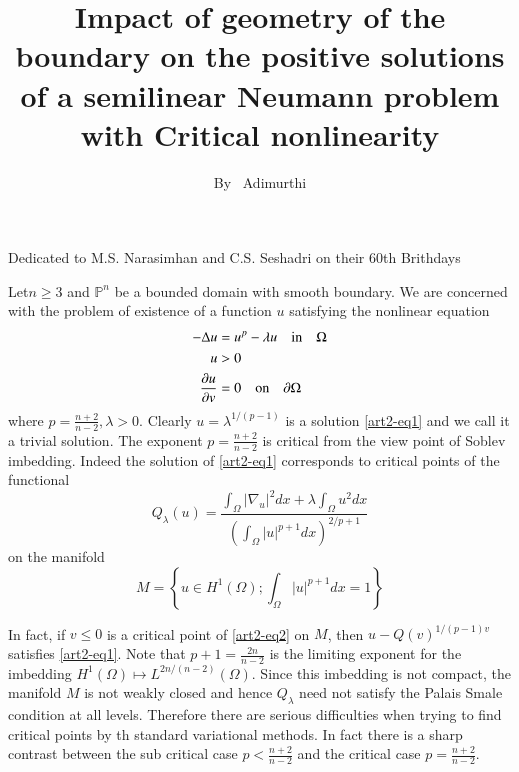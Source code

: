 \title{Impact of geometry of the boundary on the positive solutions of a semilinear Neumann problem with Critical nonlinearity}

\author{By~ Adimurthi}



\date{}
\maketitle

\begin{center}
Dedicated to M.S. Narasimhan and C.S. Seshadri on their 60th Brithdays
\end{center}

Let\pageoriginale $n\geq3$ and $\mathbb{P}^{n}$ be a bounded domain with smooth boundary. We are concerned with the problem
of existence of a function $u$ satisfying the nonlinear equation
\begin{align}
-\Delta u &= u^{p}-\lambda u \quad{\rm in}\quad \Omega \nonumber\\
u &> 0 \nonumber\\
\dfrac{\partial u}{\partial v} &= 0 \quad {\rm on}\quad \partial \Omega \label{art2-eq1} 
\end{align}
where $p=\frac{n+2}{n-2},\lambda > 0$. Clearly $u=\lambda^{1/(p-1)}$ is a solution \ref{art2-eq1} and we call it a trivial solution. The exponent $p=\frac{n+2}{n-2}$ is critical from the view point of Soblev imbedding. Indeed the solution of \ref{art2-eq1} corresponds to critical points of the functional
\begin{equation}
Q_{\lambda}(u) = \dfrac{\int_{\Omega}|\nabla_{u}|^{2}dx + \lambda\int_{\Omega}u^{2}dx}{\left(\int_{\Omega}|u|^{p+1}dx\right)^{2/p+1}}\label{art2-eq2}
\end{equation}
on the manifold
\begin{equation}
M =\left\{u\in H^{1} (\Omega) ; \int_{\Omega}|u|^{p+1}dx=1\right\}\label{art2-eq3}
\end{equation}

In fact, if $v\leq 0$ is a critical point of \ref{art2-eq2} on $M$, then $u-Q(v)^{1/(p-1)v}$ satisfies \ref{art2-eq1}. Note that $p+1 =\frac{2n}{n-2}$ is the limiting exponent for the imbedding $H^{1}(\Omega)\mapsto L^{2n/(n-2)}(\Omega)$. Since this imbedding is not compact, the manifold $M$ is not weakly closed and hence $Q_{\lambda}$ need not satisfy the Palais Smale condition at all levels. Therefore there are serious difficulties when trying to find critical points by th standard variational methods. In fact there is a sharp contrast between the sub critical case $p<\frac{n+2}{n-2}$ and the critical case $p=\frac{n+2}{n-2}$.
  
